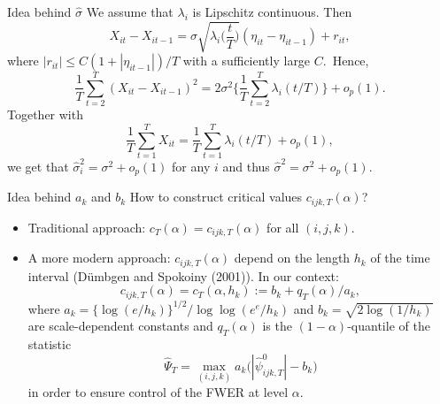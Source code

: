 \documentclass[10pt]{beamer}
\begin{document}
\begin{frame}[label = frame_sigma]{Idea behind $\hat{\sigma}$}
We assume that $\lambda_i$ is Lipschitz continuous. Then
\[ X_{it} - X_{it-1} = \sigma \sqrt{\lambda_i\Big(\frac{t}{T}\Big)} (\eta_{it} - \eta_{it-1}) + r_{it}, \]
where $|r_{it}| \le C(1+|\eta_{it-1}|)/T$ with a sufficiently large $C$.\pause \, Hence,
\[ \frac{1}{T} \sum_{t=2}^T (X_{it} - X_{it-1})^2 = 2 \sigma^2 \Big\{ \frac{1}{T} \sum_{t=2}^T \lambda_i(t/T) \Big\} + o_p(1).\] \pause
Together with \[ \frac{1}{T} \sum_{t=1}^T X_{it} = \frac{1}{T} \sum_{t=1}^T \lambda_i(t/T) + o_p(1), \] we get that $\hat{\sigma}_i^2 = \sigma^2 + o_p(1)$ for any $i$ and thus $\hat{\sigma}^2 = \sigma^2 + o_p(1)$.

\hyperlink{frame_teststatistic}{}
\end{frame}

\begin{frame}[label = frame_constants]{Idea behind $a_k$ and $b_k$}
How to construct critical values $c_{ijk,T}(\alpha)$? 
\begin{itemize}
\item Traditional approach: $c_T(\alpha) = c_{ijk,T}(\alpha)$ for all $(i,j,k)$. \pause
\item A more modern approach: $c_{ijk,T}(\alpha)$ depend on the length $h_k$ of the time interval (D{\"u}mbgen and Spokoiny (2001)). In our context:
\begin{equation*}
c_{ijk,T}(\alpha) = c_T(\alpha,h_k) := b_k + q_T(\alpha)/a_k, 
\end{equation*}
where $a_k = \{\log(e/h_k)\}^{1/2} / \log \log(e^e / h_k)$ and $b_k = \sqrt{2 \log(1/h_k)}$ are scale-dependent constants and $q_T(\alpha)$ is the $(1-\alpha)$-quantile of the statistic 
\[ \hat{\Psi}_T = \max_{(i,j,k)} a_k \big( |\hat{\psi}_{ijk,T}^0| - b_k \big) \]
in order to ensure control of the FWER at level $\alpha$.
\end{itemize}
\hyperlink{frame_test<4>}{}
\end{frame}
\end{document}
